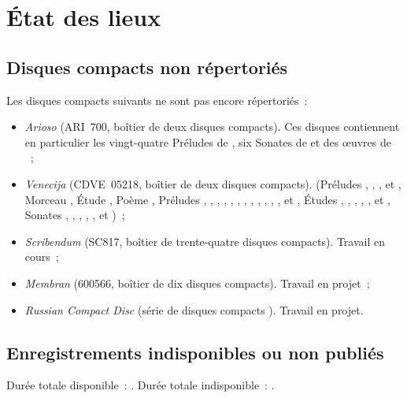 \chapter[%
État des lieux][%
État des lieux]{%
État des lieux}
\label{chap:Etat-des-lieux}

\section{Disques compacts non répertoriés}
\label{sec:Nonrepertorie}

Les disques compacts suivants ne sont pas encore répertoriés~:
\begin{itemize}
 \item
 \emph{Arioso} (ARI~700, boîtier de deux disques compacts).
 Ces disques contiennent en particulier les vingt-quatre Préludes 
 de \Chopin{}, six Sonates de \Scriabine{} et des œuvres de \Liadov{}~;
 \item
 \emph{Venecija} (CDVE~05218, boîtier de deux disques compacts).
 \Scriabine{} (Préludes  ,  ,
  ,   et  ,
 Morceau  , Étude  , Poème 
 , Préludes  ,  , 
 ,  ,  , 
 ,  ,  , 
 ,  ,  , 
 ,   et  , Études
  ,  ,  , 
 ,  ,   et 
 , Sonates , , , , ,
  et )~;
 \item
 \emph{Scribendum} (SC817, boîtier de trente-quatre disques compacts).
 Travail en cours~;
 \item
 \emph{Membran} (600566, boîtier de dix disques compacts).
 Travail en projet~;
 \item
 \emph{Russian Compact Disc} (série de disques compacts ).
 Travail en projet.
\end{itemize}

\section{Enregistrements indisponibles ou non publiés}
\label{sec:IndisponibleNonpublie}

Durée totale disponible~: \availabletotaltime.
Durée totale indisponible~: \unavailabletotaltime.
